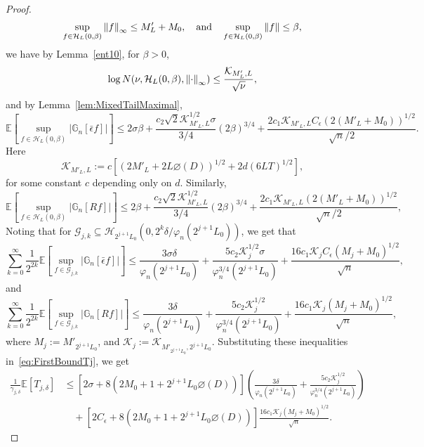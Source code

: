 \begin{proof}
\[
\sup_{f\in\mathcal{H}_L(0, \beta)}\left\lVert f\right\rVert_{\infty} \le M_L' + M_0,\quad\mbox{and}\quad \sup_{f\in\mathcal{H}_L(0, \beta)}\left\lVert f\right\rVert \le \beta,
\]
we have by Lemma~\ref{ent10}, for $\beta > 0$,
\[
\log N(\nu, \mathcal{H}_L(0, \beta), \left\lVert\cdot\right\rVert_{\infty}) \le \frac{\mathcal{K}_{M'_L, L}}{\sqrt{\nu}},
\]
and by Lemma~\ref{lem:MixedTailMaximal},
\[
\mathbb{E}\left[\sup_{f\in\mathcal{H}_L\left(0, \beta\right)}\left|\mathbb{G}_n\left[\bar\epsilon f\right]\right|\right] \le 2\sigma\beta + \frac{c_2\sqrt{2}\mathcal{K}_{M'_L, L}^{1/2}\sigma}{3/4}(2\beta)^{3/4} + \frac{2c_1\mathcal{K}_{M'_L, L}C_{\epsilon}(2(M'_L + M_0))^{1/2}}{\sqrt{n}/2}.
\]
Here
\[
\mathcal{K}_{M'_L, L} := c\left[\left(2M'_L + 2L\diameter(D)\right)^{1/2} + 2d(6LT)^{1/2}\right],
\]
for some constant $c$ depending only on $d$. Similarly,
\[
\mathbb{E}\left[\sup_{f\in\mathcal{H}_L\left(0, \beta\right)}\left|\mathbb{G}_n\left[Rf\right]\right|\right] \le 2\beta + \frac{c_2\sqrt{2}\mathcal{K}_{M'_L, L}^{1/2}}{3/4}(2\beta)^{3/4} + \frac{2c_1\mathcal{K}_{M'_L, L}(2(M'_L + M_0))^{1/2}}{\sqrt{n}/2},
\]
Noting that for $\mathcal{G}_{j,k}\subseteq\mathcal{H}_{2^{j+1}L_0}\left(0, 2^k\delta/\varphi_n(2^{j+1}L_0)\right)$, we get that
\begin{equation}
\sum_{k = 0}^{\infty} \frac{1}{2^{2k}}\mathbb{E}\left[\sup_{f\in\mathcal{G}_{j,k}}\left|\mathbb{G}_n\left[\bar\epsilon f\right]\right|\right] \le \frac{3\sigma\delta}{\varphi_n(2^{j+1}L_0)} + \frac{{5c_2\mathcal{K}_{j}^{1/2}\sigma}}{\varphi_n^{3/4}(2^{j+1}L_0)} + \frac{16c_1\mathcal{K}_{j}C_{\epsilon}(M_j + M_0)^{1/2}}{\sqrt{n}},
\end{equation}
and
\begin{equation}
\sum_{k = 0}^{\infty} \frac{1}{2^{2k}}\mathbb{E}\left[\sup_{f\in\mathcal{G}_{j,k}}\left|\mathbb{G}_n\left[Rf\right]\right|\right] \le \frac{3\delta}{\varphi_n(2^{j+1}L_0)} + \frac{{5c_2\mathcal{K}_{j}^{1/2}}}{\varphi_n^{3/4}(2^{j+1}L_0)} + \frac{16c_1\mathcal{K}_{j}(M_j + M_0)^{1/2}}{\sqrt{n}},
\end{equation}
where $M_j := M'_{2^{j+1}L_0}$, and $\mathcal{K}_j := \mathcal{K}_{M'_{2^{j+1}L_0}, 2^{j+1}L_0}$. Substituting these inequalities in~\eqref{eq:FirstBoundTj}, we get
\begin{align*}
\frac{1}{\gamma_{j,\delta}}\mathbb{E}\left[T_{j,\delta}\right] &\le \left[2\sigma + 8(2M_0 + 1 + 2^{j+1}L_0\diameter(D))\right]\left(\frac{3\delta}{\varphi_n(2^{j+1}L_0)} + \frac{5c_2\mathcal{K}_{j}^{1/2}}{\varphi_n^{3/4}(2^{j+1}L_0)}\right)\\
&\quad+ \left[2C_{\epsilon} + 8(2M_0 + 1 + 2^{j+1}L_0\diameter(D))\right]\frac{16c_1\mathcal{K}_j(M_j + M_0)^{1/2}}{\sqrt{n}}.
\end{align*}


\end{proof}

